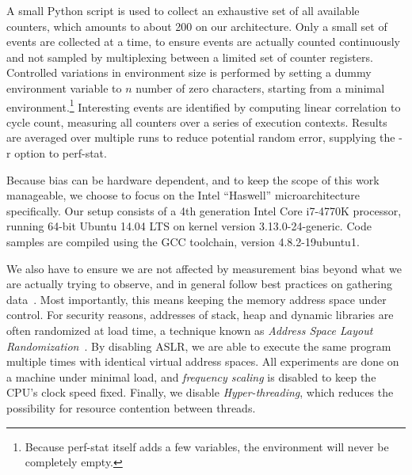 \documentclass[prodmode,acmtaco]{acmsmall}
\begin{document}
A small Python script is used to collect an exhaustive set of all available counters, which amounts to about 200 on our architecture.
Only a small set of events are collected at a time, to ensure events are actually counted continuously and not sampled by multiplexing between a limited set of counter registers.
Controlled variations in environment size is performed by setting a dummy environment variable to $n$ number of zero characters, starting from a minimal environment.\footnote{Because perf-stat itself adds a few variables, the environment will never be completely empty.}
Interesting events are identified by computing linear correlation to cycle count, measuring all counters over a series of execution contexts.
Results are averaged over multiple runs to reduce potential random error, supplying the -r option to perf-stat.

Because bias can be hardware dependent, and to keep the scope of this work manageable, we choose to focus on the Intel ``Haswell'' microarchitecture specifically.
Our setup consists of a 4th generation Intel\textsuperscript{\textregistered{}} Core\texttrademark{} i7-4770K processor, running 64-bit Ubuntu 14.04 LTS on kernel version 3.13.0-24-generic.
Code samples are compiled using the {\small GCC} toolchain, version 4.8.2-19ubuntu1.

We also have to ensure we are not affected by measurement bias beyond what we are actually trying to observe, and in general follow best practices on gathering data~\cite{Mytkowicz:2009:WrongData}.
Most importantly, this means keeping the memory address space under control.
For security reasons, addresses of stack, heap and dynamic libraries are often randomized at load time, a technique known as \emph{Address Space Layout Randomization}~\cite{Shackham:2004:ASLR}. %
By disabling ASLR, we are able to execute the same program multiple times with identical virtual address spaces.
All experiments are done on a machine under minimal load, and \emph{frequency scaling} is disabled to keep the CPU's clock speed fixed.
Finally, we disable \emph{Hyper-threading}, which reduces the possibility for resource contention between threads.
\end{document}
